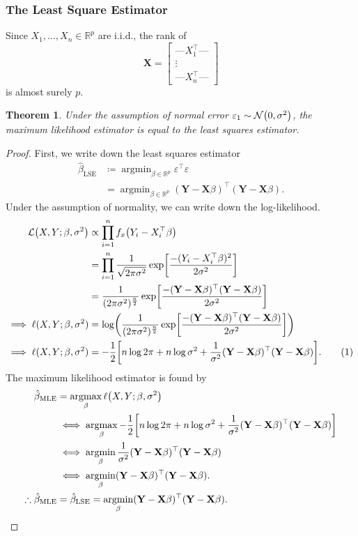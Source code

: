 \documentclass[letterpaper, reqno]{amsart}
\newtheorem{theorem}{Theorem}[section]
\numberwithin{equation}{section}
\newcommand{\numberthis}{\addtocounter{equation}{1}\tag{\theequation}}
\newcommand{\T}{\top} %
\newcommand{\vect}[1]{\boldsymbol{\mathbf{#1}}} %
\newcommand{\Li}[1]{\mathcal{L}\mleft( #1 \mright)}  %
\newcommand{\R}{\mathbb{R}}  %
\newcommand{\N}[2]{\mathcal{N}\mleft( #1, #2 \mright)}
\newcommand{\iid}{i.i.d.}
\newcommand{\Xm}{\vect{X}}
\newcommand{\Yv}{\vect{Y}}
\newcommand{\Bv}{\beta}
\newcommand{\Bvh}{\hat{\beta}}
\newcommand{\ve}{\varepsilon}
\DeclareMathOperator*{\argmin}{argmin}
\DeclareMathOperator*{\argmax}{argmax}
\begin{document}
\subsubsection{The Least Square Estimator}
Since $X_1, \dots, X_n \in \R^p$ are \iid, the rank of
\[ \Xm = \begin{bmatrix} 
            \text{---} X_1^\T \text{---} \\
            \vdots \\ 
            \text{---} X_n^\T \text{---} 
          \end{bmatrix} 
\]
is almost surely $p$.

\begin{theorem}
  Under the assumption of normal error $\ve_1 \sim \N{0}{\sigma^2}$, the maximum
  likelihood estimator is equal to the least squares estimator.
\end{theorem}

\begin{proof}
  First, we write down the least squares estimator
  \begin{align*}
    \Bvh_\mathrm{LSE} &\coloneqq \argmin_{\Bv \in \R^p} \ve^\T \ve \\
                      &= \argmin_{\Bv \in \R^p} (\Yv - \Xm\Bv)^\T (\Yv - \Xm\Bv).
  \end{align*}
  Under the assumption of normality, we can write down the log-likelihood.
  \begin{align*}
    \Li{X, Y; \Bv, \sigma^2} &\propto \prod_{i=1}^n f_x\mleft(Y_i - X_i^\T\Bv\mright) \\
    &= \prod_{i=1}^n \frac{1}{\sqrt{2\pi\sigma^2}} 
       \exp \mleft[\frac{-(Y_i - X_i^\T\Bv)^2}{2\sigma^2}\mright] \\
    &= \frac{1}{(2\pi\sigma^2)^\frac{n}{2}} 
       \exp \mleft[\frac{-(\Yv - \Xm\Bv)^\T(\Yv - \Xm\Bv)}{2\sigma^2}\mright] \\
    \implies \ell(X, Y; \Bv, \sigma^2) &= \log\mleft( \frac{1}{(2\pi\sigma^2)^\frac{n}{2}} 
       \exp \mleft[\frac{-(\Yv - \Xm\Bv)^\T(\Yv - \Xm\Bv)}{2\sigma^2}\mright]
       \mright) \\
    \implies \ell(X, Y; \Bv, \sigma^2) &= -\frac{1}{2}\mleft[ n\log 2\pi + n \log\sigma^2 
          + \frac{1}{\sigma^2} (\Yv - \Xm\Bv)^\T(\Yv - \Xm\Bv) \mright]. \numberthis \label{eq:likelihood}
  \end{align*}
  The maximum likelihood estimator is found by
  \begin{align*}
    \Bvh_\mathrm{MLE} &= \argmax_\Bv \ell\mleft(X, Y; \Bv, \sigma^2\mright) \\
    &\iff \argmax_\Bv -\frac{1}{2}\mleft[ n\log 2\pi + n\log\sigma^2 
          + \frac{1}{\sigma^2} (\Yv - \Xm\Bv)^\T(\Yv - \Xm\Bv) \mright] \\
    &\iff \argmin_\Bv \frac{1}{\sigma^2} (\Yv - \Xm\Bv)^\T(\Yv - \Xm\Bv) \\
    &\iff \argmin_\Bv (\Yv - \Xm\Bv)^\T(\Yv - \Xm\Bv). \\
    \therefore \Bvh_\mathrm{MLE} &= \Bvh_\mathrm{LSE} = \argmin_\Bv (\Yv - \Xm\Bv)^\T(\Yv - \Xm\Bv). \qedhere
  \end{align*}
\end{proof}
\end{document}
